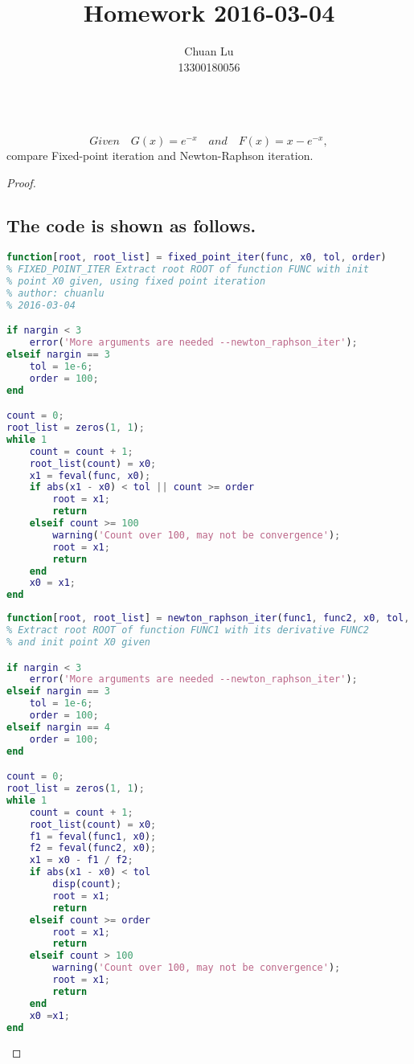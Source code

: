\documentclass[12pt]{article}
\newenvironment{problem}[2][Problem]{\begin{trivlist}
\item[\hskip \labelsep {\bfseries #1}\hskip \labelsep {\bfseries #2.}]}{\end{trivlist}}
\begin{document}
\title{Homework 2016-03-04}
\author{Chuan Lu\\
13300180056}

\maketitle

\begin{problem}{1}
\text{ }\\
$$Given\quad G(x) = e^{-x} \quad and \quad F(x) = x - e^{-x},$$ compare Fixed-point iteration and Newton-Raphson iteration.
\end{problem}

\begin{proof}
\subsection{The code is shown as follows.}
\begin{lstlisting}[language={MATLAB}]
function[root, root_list] = fixed_point_iter(func, x0, tol, order)
% FIXED_POINT_ITER Extract root ROOT of function FUNC with init
% point X0 given, using fixed point iteration
% author: chuanlu
% 2016-03-04

if nargin < 3
    error('More arguments are needed --newton_raphson_iter');
elseif nargin == 3
    tol = 1e-6;
    order = 100;
end

count = 0;
root_list = zeros(1, 1);
while 1
    count = count + 1;
    root_list(count) = x0;
    x1 = feval(func, x0);
    if abs(x1 - x0) < tol || count >= order
        root = x1;
        return
    elseif count >= 100
        warning('Count over 100, may not be convergence');
        root = x1;
        return
    end
    x0 = x1;
end
\end{lstlisting}

\begin{lstlisting}[language={MATLAB}]
function[root, root_list] = newton_raphson_iter(func1, func2, x0, tol, order)
% Extract root ROOT of function FUNC1 with its derivative FUNC2
% and init point X0 given

if nargin < 3
    error('More arguments are needed --newton_raphson_iter');
elseif nargin == 3
    tol = 1e-6;
    order = 100;
elseif nargin == 4
    order = 100;
end

count = 0;
root_list = zeros(1, 1);
while 1
    count = count + 1;
    root_list(count) = x0;
    f1 = feval(func1, x0);
    f2 = feval(func2, x0);
    x1 = x0 - f1 / f2;
    if abs(x1 - x0) < tol
        disp(count);
        root = x1;
        return
    elseif count >= order
        root = x1;
        return
    elseif count > 100
        warning('Count over 100, may not be convergence');
        root = x1;
        return
    end
    x0 =x1;
end
\end{lstlisting}


\end{proof}
\end{document}
